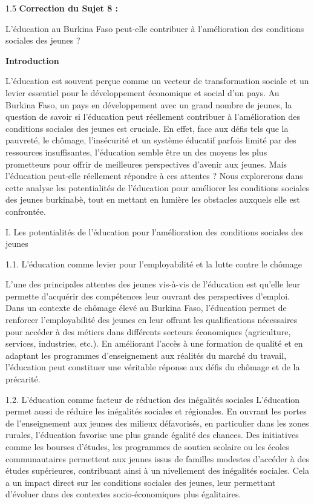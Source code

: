 \documentclass[12pt]{article}
\begin{document}
\begin{spacing}{1.5}
\textbf{Correction du Sujet 8 :} 

L'éducation au Burkina Faso peut-elle contribuer à l'amélioration des conditions sociales des jeunes ?

 \textbf{Introduction}

L'éducation est souvent perçue comme un vecteur de transformation sociale et un levier essentiel pour le développement économique et social d'un pays. Au Burkina Faso, un pays en développement avec un grand nombre de jeunes, la question de savoir si l'éducation peut réellement contribuer à l'amélioration des conditions sociales des jeunes est cruciale. En effet, face aux défis tels que la pauvreté, le chômage, l'insécurité et un système éducatif parfois limité par des ressources insuffisantes, l'éducation semble être un des moyens les plus prometteurs pour offrir de meilleures perspectives d'avenir aux jeunes. Mais l'éducation peut-elle réellement répondre à ces attentes ? Nous explorerons dans cette analyse les potentialités de l'éducation pour améliorer les conditions sociales des jeunes burkinabè, tout en mettant en lumière les obstacles auxquels elle est confrontée.

I. Les potentialités de l'éducation pour l'amélioration des conditions sociales des jeunes

1.1. L'éducation comme levier pour l'employabilité et la lutte contre le chômage 

L'une des principales attentes des jeunes vis-à-vis de l'éducation est qu'elle leur permette d'acquérir des compétences leur ouvrant des perspectives d'emploi. Dans un contexte de chômage élevé au Burkina Faso, l'éducation permet de renforcer l'employabilité des jeunes en leur offrant les qualifications nécessaires pour accéder à des métiers dans différents secteurs économiques (agriculture, services, industries, etc.). En améliorant l'accès à une formation de qualité et en adaptant les programmes d'enseignement aux réalités du marché du travail, l'éducation peut constituer une véritable réponse aux défis du chômage et de la précarité.

1.2. L'éducation comme facteur de réduction des inégalités sociales  
L'éducation permet aussi de réduire les inégalités sociales et régionales. En ouvrant les portes de l'enseignement aux jeunes des milieux défavorisés, en particulier dans les zones rurales, l'éducation favorise une plus grande égalité des chances. Des initiatives comme les bourses d'études, les programmes de soutien scolaire ou les écoles communautaires permettent aux jeunes issus de familles modestes d'accéder à des études supérieures, contribuant ainsi à un nivellement des inégalités sociales. Cela a un impact direct sur les conditions sociales des jeunes, leur permettant d'évoluer dans des contextes socio-économiques plus égalitaires.


\end{spacing}
\end{document}
